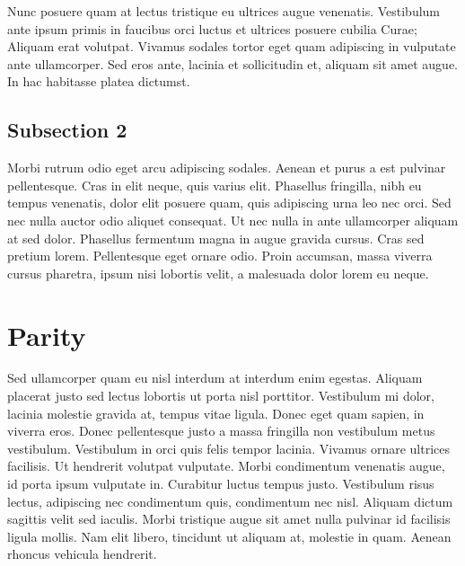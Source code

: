 Nunc posuere quam at lectus tristique eu ultrices augue venenatis. Vestibulum ante ipsum primis in faucibus orci luctus et ultrices posuere cubilia Curae; Aliquam erat volutpat. Vivamus sodales tortor eget quam adipiscing in vulputate ante ullamcorper. Sed eros ante, lacinia et sollicitudin et, aliquam sit amet augue. In hac habitasse platea dictumst.


\subsection{Subsection 2}
Morbi rutrum odio eget arcu adipiscing sodales. Aenean et purus a est pulvinar pellentesque. Cras in elit neque, quis varius elit. Phasellus fringilla, nibh eu tempus venenatis, dolor elit posuere quam, quis adipiscing urna leo nec orci. Sed nec nulla auctor odio aliquet consequat. Ut nec nulla in ante ullamcorper aliquam at sed dolor. Phasellus fermentum magna in augue gravida cursus. Cras sed pretium lorem. Pellentesque eget ornare odio. Proin accumsan, massa viverra cursus pharetra, ipsum nisi lobortis velit, a malesuada dolor lorem eu neque.


\section{Parity}

Sed ullamcorper quam eu nisl interdum at interdum enim egestas. Aliquam placerat justo sed lectus lobortis ut porta nisl porttitor. Vestibulum mi dolor, lacinia molestie gravida at, tempus vitae ligula. Donec eget quam sapien, in viverra eros. Donec pellentesque justo a massa fringilla non vestibulum metus vestibulum. Vestibulum in orci quis felis tempor lacinia. Vivamus ornare ultrices facilisis. Ut hendrerit volutpat vulputate. Morbi condimentum venenatis augue, id porta ipsum vulputate in. Curabitur luctus tempus justo. Vestibulum risus lectus, adipiscing nec condimentum quis, condimentum nec nisl. Aliquam dictum sagittis velit sed iaculis. Morbi tristique augue sit amet nulla pulvinar id facilisis ligula mollis. Nam elit libero, tincidunt ut aliquam at, molestie in quam. Aenean rhoncus vehicula hendrerit.